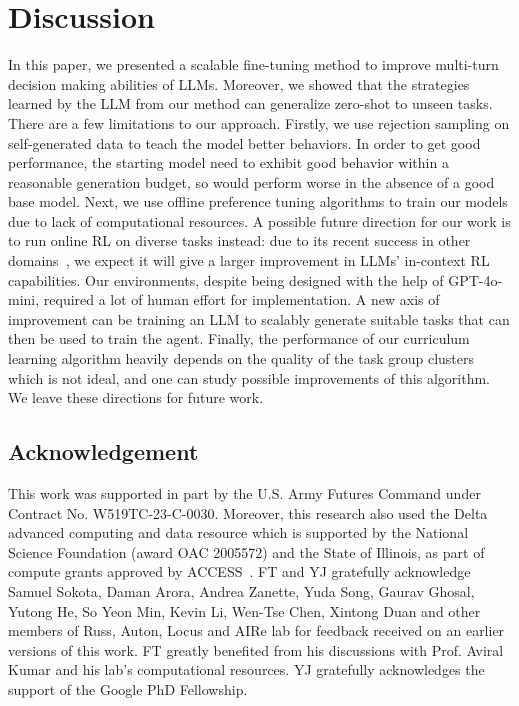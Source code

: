\section{Discussion}

In this paper, we presented a scalable fine-tuning method to improve multi-turn decision making abilities of LLMs. Moreover, we showed that the strategies learned by the LLM from our method can generalize zero-shot to unseen tasks. There are a few limitations to our approach. Firstly, we use rejection sampling on self-generated data to teach the model better behaviors. In order to get good performance, the starting model need to exhibit good behavior within a reasonable generation budget, so \ours{} would perform worse in the absence of a good base model. Next, we use offline preference tuning algorithms to train our models due to lack of computational resources. A possible future direction for our work is to run online RL on diverse tasks instead: due to its recent success in other domains~\citep{deepseekai2025deepseekr1incentivizingreasoningcapability}, we expect it will give a larger improvement in LLMs' in-context RL capabilities. Our environments, despite being designed with the help of GPT-4o-mini, required a lot of human effort for implementation. A new axis of improvement can be training an LLM to scalably generate suitable tasks that can then be used to train the agent. Finally, the performance of our curriculum learning algorithm heavily depends on the quality of the task group clusters which is not ideal, and one can study possible improvements of this algorithm. We leave these directions for future work.

\subsection*{Acknowledgement}

This work was supported in part by the U.S. Army Futures Command under Contract No. W519TC-23-C-0030. Moreover, this research also used the Delta advanced computing and data resource which is supported by the National Science Foundation (award OAC 2005572) and the State of Illinois, as part of compute grants approved by ACCESS~\citep{access_compute}. FT and YJ gratefully acknowledge Samuel Sokota, Daman Arora, Andrea Zanette, Yuda Song, Gaurav Ghosal, Yutong He, So Yeon Min, Kevin Li, Wen-Tse Chen, Xintong Duan and other members of Russ, Auton, Locus and AIRe lab for feedback received on an earlier versions of this work. FT greatly benefited from his discussions with Prof. Aviral Kumar and his lab's computational resources. YJ gratefully acknowledges the support of the Google PhD Fellowship.




